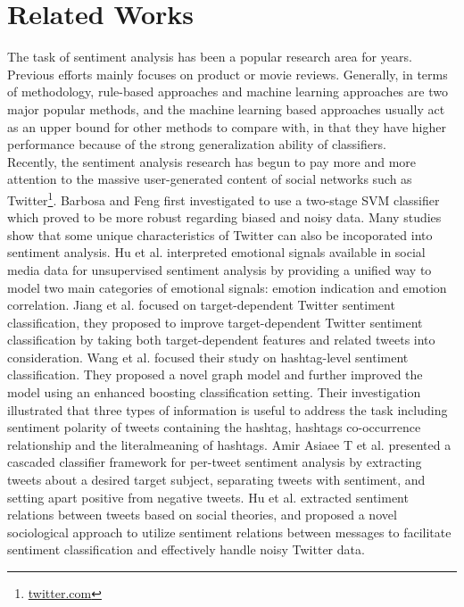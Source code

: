 \documentclass{llncs}
\begin{document}
\section{Related Works}
\label{related}
The task of sentiment analysis has been a popular research area for years. 
Previous efforts mainly focuses on product or movie reviews. 
Generally, in terms of methodology, rule-based approaches and machine learning approaches are two major popular methods, 
and the machine learning based approaches usually act as an upper bound for other methods to compare with, in that they have higher performance because of the strong generalization ability of classifiers\cite{xsongx:b4,xsongx:b1}.\\
Recently, the sentiment analysis research has begun to pay more and more attention to the massive user-generated content of social networks such as Twitter\footnote{\url{twitter.com}}. 
Barbosa and Feng\cite{Barbosa:2010RSD} first investigated to use a two-stage SVM classifier which proved to be more robust regarding biased and noisy data. 
Many studies show that some unique characteristics of Twitter can also be incoporated into sentiment analysis.
Hu et al.\cite{Hu:2013www} interpreted emotional signals available in social media data for unsupervised sentiment analysis by providing a unified way to model two main categories of emotional signals: emotion indication and emotion correlation. 
Jiang et al.\cite{xsongx:b6} focused on target-dependent Twitter sentiment classification, they proposed to improve target-dependent Twitter sentiment classification by taking both target-dependent features and related tweets into consideration. 
Wang et al.\cite{Wang:2011TSA} focused their study on hashtag-level sentiment classification. 
They proposed a novel graph model and further improved the model using an enhanced boosting classification setting. 
Their investigation illustrated that three types of information is useful to address the task including sentiment polarity of tweets containing the hashtag, hashtags co-occurrence relationship and the literalmeaning of hashtags.
Amir Asiaee T et al.\cite{AsiaeeT:2012} presented a cascaded classifier framework for per-tweet sentiment analysis by extracting tweets about a desired target subject, separating tweets with sentiment, and  setting apart positive from negative tweets.
Hu et al.\cite{Hu:2013ESR} extracted sentiment relations between tweets based on social theories, and proposed a novel sociological approach to utilize sentiment relations between messages to facilitate sentiment classification and effectively handle noisy Twitter data.
\end{document}
